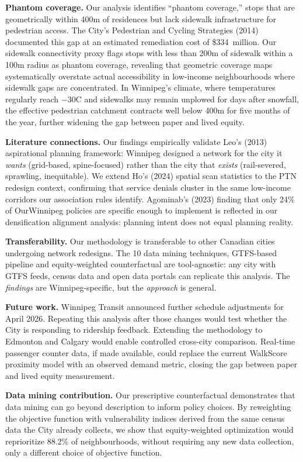 \documentclass[11pt]{article}
\begin{document}
\textbf{Phantom coverage.} Our analysis identifies ``phantom coverage,'' stops that are geometrically within 400m of residences but lack sidewalk infrastructure for pedestrian access. The City's Pedestrian and Cycling Strategies (2014) documented this gap at an estimated remediation cost of \$334~million. Our sidewalk connectivity proxy flags stops with less than 200m of sidewalk within a 100m radius as phantom coverage, revealing that geometric coverage maps systematically overstate actual accessibility in low-income neighbourhoods where sidewalk gaps are concentrated. In Winnipeg's climate, where temperatures regularly reach $-30$\textdegree C and sidewalks may remain unplowed for days after snowfall, the effective pedestrian catchment contracts well below 400m for five months of the year, further widening the gap between paper and lived equity.

\textbf{Literature connections.} Our findings empirically validate Leo's (2013) aspirational planning framework: Winnipeg designed a network for the city it \emph{wants} (grid-based, spine-focused) rather than the city that \emph{exists} (rail-severed, sprawling, inequitable). We extend Ho's (2024) spatial scan statistics to the PTN redesign context, confirming that service denials cluster in the same low-income corridors our association rules identify. Agominab's (2023) finding that only 24\% of OurWinnipeg policies are specific enough to implement is reflected in our densification alignment analysis: planning intent does not equal planning reality.

\textbf{Transferability.} Our methodology is transferable to other Canadian cities undergoing network redesigns. The 10 data mining techniques, GTFS-based pipeline and equity-weighted counterfactual are tool-agnostic: any city with GTFS feeds, census data and open data portals can replicate this analysis. The \emph{findings} are Winnipeg-specific, but the \emph{approach} is general.

\textbf{Future work.} Winnipeg Transit announced further schedule adjustments for April 2026. Repeating this analysis after those changes would test whether the City is responding to ridership feedback. Extending the methodology to Edmonton and Calgary would enable controlled cross-city comparison. Real-time passenger counter data, if made available, could replace the current WalkScore proximity model with an observed demand metric, closing the gap between paper and lived equity measurement.

\textbf{Data mining contribution.} Our prescriptive counterfactual demonstrates that data mining can go beyond description to inform policy choices. By reweighting the objective function with vulnerability indices derived from the same census data the City already collects, we show that equity-weighted optimization would reprioritize 88.2\% of neighbourhoods, without requiring any new data collection, only a different choice of objective function.
\end{document}
